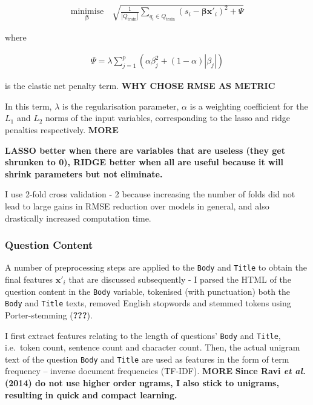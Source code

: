 \documentclass[11pt,preprint, authoryear]{article}
\numberwithin{equation}{section}
\begin{document}
\begin{align} \label{eq:rmse}
\underset{\bm{\beta}}{\text{minimise}} \quad \sqrt{ \frac{1}{|Q_\text{train}|} \sum_{ q_{i} \in Q_{\text{train}} } ( s_i - {\bm{\beta}\bm{x'}_i} )^2 + \Psi }
\end{align}

where

\begin{align} \label{eq:penalty}
\Psi = \lambda \sum_{j=1}^p ( \alpha\beta_j^2 + (1-\alpha)|\beta_j| )
\end{align}

is the elastic net penalty term. \textbf{WHY CHOSE RMSE AS METRIC}

In this term, \(\lambda\) is the regularisation parameter, \(\alpha\) is
a weighting coefficient for the \(L_1\) and \(L_2\) norms of the input
variables, corresponding to the lasso and ridge penalties respectively.
\textbf{MORE}

\textbf{LASSO better when there are variables that are useless (they get
shrunken to 0), RIDGE better when all are useful because it will shrink
parameters but not eliminate.}

I use 2-fold cross validation - 2 because increasing the number of folds
did not lead to large gains in RMSE reduction over models in general,
and also drastically increased computation time.

\subsubsection{Question Content}\label{question-content}

A number of preprocessing steps are applied to the \texttt{Body} and
\texttt{Title} to obtain the final features \(\bm{x'}_i\) that are
discussed subsequently - I parsed the HTML of the question content in
the \texttt{Body} variable, tokenised (with punctuation) both the
\texttt{Body} and \texttt{Title} texts, removed English stopwords and
stemmed tokens using Porter-stemming ({\textbf{???}}).

I first extract features relating to the length of questions'
\texttt{Body} and \texttt{Title}, i.e.~token count, sentence count and
character count. Then, the actual unigram text of the question
\texttt{Body} and \texttt{Title} are used as features in the form of
term frequency -- inverse document frequencies (TF-IDF). \textbf{MORE}
\textbf{Since Ravi \emph{et al.} (2014) do not use higher order ngrams,
I also stick to unigrams, resulting in quick and compact learning.}
\end{document}
